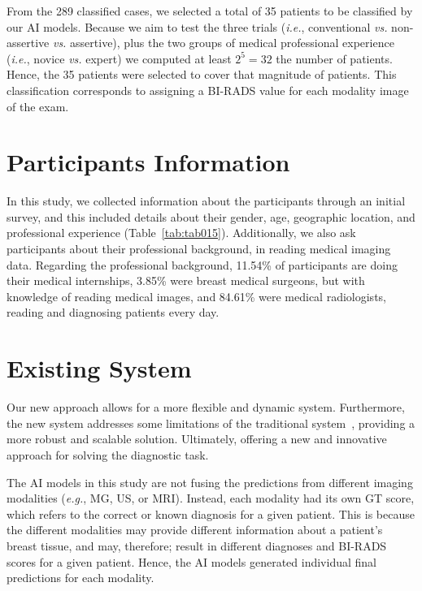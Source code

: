 From the 289 classified cases, we selected a total of 35 patients to be classified by our \ac{AI} models.
Because we aim to test the three trials ({\it i.e.}, conventional {\it vs.} non-assertive {\it vs.} assertive), plus the two groups of medical professional experience ({\it i.e.}, novice {\it vs.} expert) we computed at least $2^5=32$ the number of patients.
Hence, the 35 patients were selected to cover that magnitude of patients.
This classification corresponds to assigning a \ac{BI-RADS} value for each modality image of the exam.

\section{Participants Information}
\label{sec:app005011}

In this study, we collected information about the participants through an initial survey, and this included details about their gender, age, geographic location, and professional experience (Table~\ref{tab:tab015}).
Additionally, we also ask participants about their professional background, in reading medical imaging data.
Regarding the professional background, 11.54\% of participants are doing their medical internships, 3.85\% were breast medical surgeons, but with knowledge of reading medical images, and 84.61\% were medical radiologists, reading and diagnosing patients every day.



\section{Existing System}
\label{sec:app005012}

Our new approach allows for a more flexible and dynamic system.
Furthermore, the new system addresses some limitations of the traditional system~\cite{CALISTO2022102285}, providing a more robust and scalable solution.
Ultimately, offering a new and innovative approach for solving the diagnostic task.

The \ac{AI} models in this study are not fusing the predictions from different imaging modalities ({\it e.g.}, \ac{MG}, \ac{US}, or \ac{MRI}).
Instead, each modality had its own \ac{GT} score, which refers to the correct or known diagnosis for a given patient.
This is because the different modalities may provide different information about a patient's breast tissue, and may, therefore; result in different diagnoses and \ac{BI-RADS} scores for a given patient.
Hence, the \ac{AI} models generated individual final predictions for each modality.

